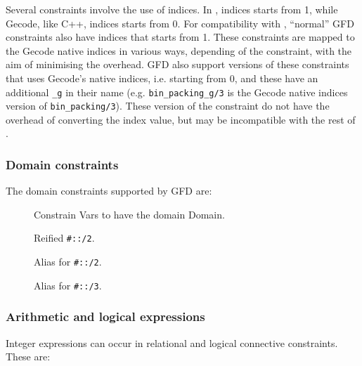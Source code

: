 Several constraints involve the use of indices. In \eclipse, indices starts
from 1, while Gecode, like C++, indices starts from 0. For compatibility 
with \eclipse, ``normal'' GFD constraints also have indices
that starts from 1. These constraints are mapped to the Gecode native 
indices in various ways, depending of the constraint, with the aim of 
minimising the overhead. GFD also support versions of these constraints that 
uses Gecode's native indices, i.e. starting from 0, and these have an 
additional {\tt _g} in their name (e.g. {\tt bin_packing_g/3} is the Gecode native
indices version of {\tt bin_packing/3}). These version of the constraint do not
have the overhead of converting the index value, but may be
incompatible with the rest of \eclipse.

\subsubsection{Domain constraints}

The domain constraints supported by GFD are:

\begin{description}
\item[]
Constrain Vars to have the domain Domain.
\item[]
Reified {\tt \#::/2}.
\item[]
Alias for {\tt \#::/2}.
\item[]
Alias for {\tt \#::/3}.

\end{description}

  
\subsubsection{Arithmetic and logical expressions}

Integer expressions can occur in relational and logical connective
constraints. These are:

